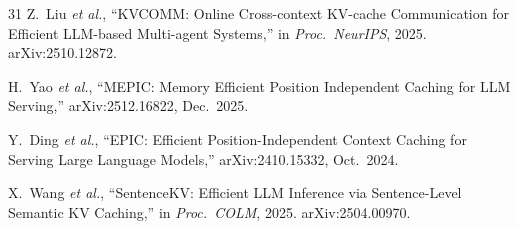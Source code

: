 \documentclass[10pt,twocolumn]{article}
\begin{document}
\begin{thebibliography}{31}
Z.~Liu \textit{et al.},
``KVCOMM: Online Cross-context KV-cache Communication for Efficient
LLM-based Multi-agent Systems,''
in \textit{Proc.\ NeurIPS}, 2025. arXiv:2510.12872.

H.~Yao \textit{et al.},
``MEPIC: Memory Efficient Position Independent Caching for LLM
Serving,''
arXiv:2512.16822, Dec.\ 2025.

Y.~Ding \textit{et al.},
``EPIC: Efficient Position-Independent Context Caching for Serving
Large Language Models,''
arXiv:2410.15332, Oct.\ 2024.

X.~Wang \textit{et al.},
``SentenceKV: Efficient LLM Inference via Sentence-Level Semantic
KV Caching,''
in \textit{Proc.\ COLM}, 2025. arXiv:2504.00970.

\end{thebibliography}
\end{document}
